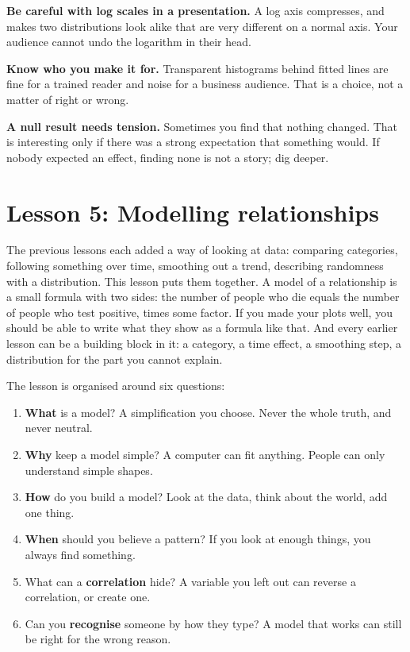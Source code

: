 \documentclass[12pt, a4paper]{article}
\theoremstyle{definition}
\theoremstyle{remark}
\begin{document}
\textbf{Be careful with log scales in a presentation.} A log axis compresses, and makes two distributions look alike that are very different on a normal axis. Your audience cannot undo the logarithm in their head.

\textbf{Know who you make it for.} Transparent histograms behind fitted lines are fine for a trained reader and noise for a business audience. That is a choice, not a matter of right or wrong.

\textbf{A null result needs tension.} Sometimes you find that nothing changed. That is interesting only if there was a strong expectation that something would. If nobody expected an effect, finding none is not a story; dig deeper.
\newpage

\section{Lesson 5: Modelling relationships}
\label{sec:lesson5}
The previous lessons each added a way of looking at data: comparing categories, following something over time, smoothing out a trend, describing randomness with a distribution. This lesson puts them together. A model of a relationship is a small formula with two sides: the number of people who die equals the number of people who test positive, times some factor. If you made your plots well, you should be able to write what they show as a formula like that. And every earlier lesson can be a building block in it: a category, a time effect, a smoothing step, a distribution for the part you cannot explain.

The lesson is organised around six questions:

\begin{enumerate}
\item \textbf{What} is a model? A simplification you choose. Never the whole truth, and never neutral.
\item \textbf{Why} keep a model simple? A computer can fit anything. People can only understand simple shapes.
\item \textbf{How} do you build a model? Look at the data, think about the world, add one thing.
\item \textbf{When} should you believe a pattern? If you look at enough things, you always find something.
\item What can a \textbf{correlation} hide? A variable you left out can reverse a correlation, or create one.
\item Can you \textbf{recognise} someone by how they type? A model that works can still be right for the wrong reason.
\end{enumerate}
\end{document}
